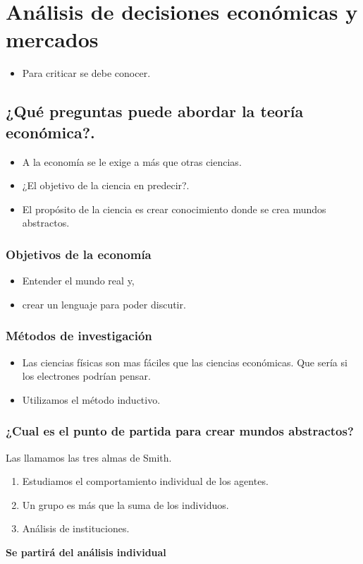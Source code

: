 \chapter{Análisis de decisiones económicas y mercados}

\begin{multicols}{2}

\begin{itemize}
    \item Para criticar se debe conocer.
\end{itemize}

\section*{¿Qué preguntas puede abordar la teoría económica?.}

\begin{itemize}
    \item A la economía se le exige a más que otras ciencias. 
    \item ¿El objetivo de la ciencia en predecir?.
    \item El propósito de la ciencia es crear conocimiento donde se crea mundos abstractos.
\end{itemize}

    \subsection*{Objetivos de la economía}

    \begin{itemize}
	\item Entender el mundo real y,
	\item crear un lenguaje para poder discutir.
    \end{itemize}

    \subsection*{Métodos de investigación}
    \begin{itemize}
	\item Las ciencias físicas son mas fáciles que las ciencias económicas. Que sería si los electrones podrían pensar.
	\item Utilizamos el método inductivo.
    \end{itemize}

    \subsection*{¿Cual es el punto de partida para crear mundos abstractos?}
    Las llamamos las tres almas de Smith.
    \begin{enumerate}[1.]
	\item Estudiamos el comportamiento individual de los agentes.
	\item Un grupo es más que la suma de los individuos.
	\item Análisis de instituciones.
    \end{enumerate}
    \textbf{Se partirá del análisis individual}


\end{multicols}
